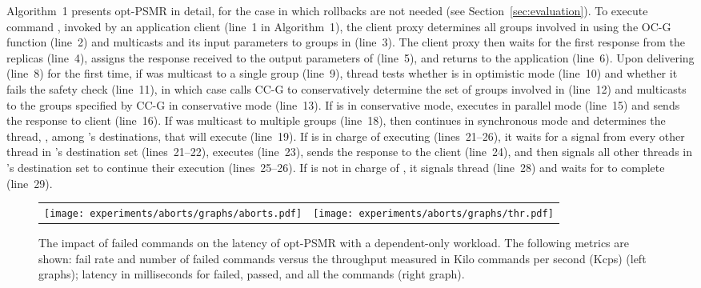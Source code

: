 \documentclass[conference]{IEEEtran}
\newcommand{\sizefactor}{0.9}
\begin{document}
Algorithm~1 presents opt-PSMR in detail, for the case in which rollbacks are not needed (see Section~\ref{sec:evaluation}).
To execute command , invoked by an application client (line~1 in Algorithm~1), the client proxy determines all groups  involved in  using the OC-G function (line~2) and multicasts  and its input parameters to groups in  (line~3). 
The client proxy then waits for the first response from the replicas (line~4), assigns the response received to the output parameters of  (line~5), and returns to the application (line~6). 
Upon delivering  (line~8) for the first time, if  was multicast to a single group (line~9), thread  tests whether  is in optimistic mode (line~10) and whether it fails the safety check (line~11), in which case  calls CC-G to conservatively determine the set of groups involved in  (line~12) and multicasts  to the groups specified by CC-G  in conservative mode (line~13).
If  is in conservative mode,  executes  in parallel mode (line~15) and sends the response to client (line~16). 
If  was multicast to multiple groups (line~18), then  continues in synchronous mode and determines the thread, , among 's destinations, that will execute  (line~19). 
If  is in charge of executing  (lines~21--26), it waits for a signal from every other thread in 's destination set (lines~21--22), executes  (line~23), sends the response to the client (line~24), and then signals all other threads in 's destination set to continue their execution (lines~25--26). 
If  is not in charge of , it signals thread  (line~28) and waits for  to complete (line~29).

\begin{figure*}[t]
  \begin{center}
    \begin{tabular}{cc}
      \texttt{[image: experiments/aborts/graphs/aborts.pdf]}&
       \texttt{[image: experiments/aborts/graphs/thr.pdf]}\\
    \end{tabular}
    \caption{The impact of failed commands on the latency of opt-PSMR with a dependent-only workload. The following metrics are shown: fail rate and number of failed commands versus the throughput measured in Kilo commands per second (Kcps) (left graphs); latency in milliseconds for failed, passed, and all the commands (right graph).}
    \vspace{-5mm}
    \label{fig:aborts-latency}
 \end{center}
\end{figure*}
\end{document}
